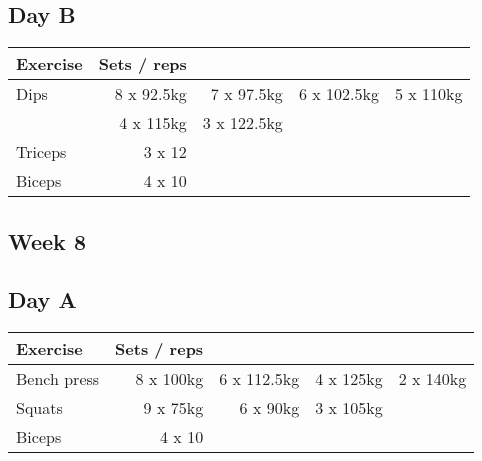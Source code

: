 \documentclass[12pt, a4paper]{article}%
\begin{document}
  \subsection*{\hspace{0.5em} Day B }


  \begin{tabular}{l|rrrr}
  \hspace{0.75em} \textbf{Exercise} & \textbf{Sets / reps} \\ \hline

            \hspace{0.75em} Dips
            & 8 x 92.5kg
            & 7 x 97.5kg
            & 6 x 102.5kg
            & 5 x 110kg
            \\


            \hspace{0.75em}
            & 4 x 115kg
            & 3 x 122.5kg
            & 
            & 
            \\


   \hspace{0.75em} Triceps & 3 x 12 \\
   \hspace{0.75em} Biceps & 4 x 10 \\
  \end{tabular}

 \subsection*{\hspace{0.25em} Week 8 }
  \subsection*{\hspace{0.5em} Day A }


  \begin{tabular}{l|rrrr}
  \hspace{0.75em} \textbf{Exercise} & \textbf{Sets / reps} \\ \hline

            \hspace{0.75em} Bench press
            & 8 x 100kg
            & 6 x 112.5kg
            & 4 x 125kg
            & 2 x 140kg
            \\


            \hspace{0.75em} Squats
            & 9 x 75kg
            & 6 x 90kg
            & 3 x 105kg
            & 
            \\


   \hspace{0.75em} Biceps & 4 x 10 \\
  \end{tabular}
\end{document}
